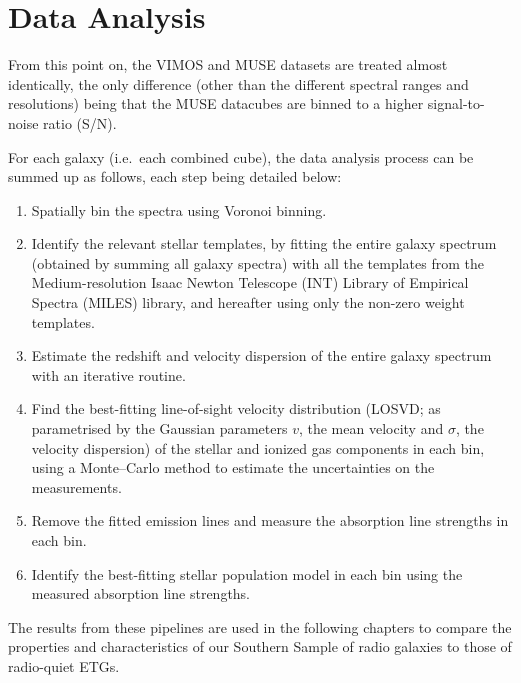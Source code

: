 \section{Data Analysis}
	\label{sec:analysis}
	From this point on, the VIMOS and MUSE datasets are treated almost identically, the only difference (other than the different spectral ranges and resolutions) being that the MUSE datacubes are binned to a higher signal-to-noise ratio (S/N).

	For each galaxy (i.e.\ each combined cube), the data analysis process can be summed up as follows, each step being detailed below:
	\begin{enumerate}
		\item Spatially bin the spectra using Voronoi binning.
		\item Identify the relevant stellar templates, by fitting the entire galaxy spectrum (obtained by summing all galaxy spectra) with all the templates from the Medium-resolution Isaac Newton Telescope (INT) Library of Empirical Spectra (MILES) library, and hereafter using only the non-zero weight templates.
		\item Estimate the redshift and velocity dispersion of the entire galaxy spectrum with an iterative routine. %
		\item Find the best-fitting line-of-sight velocity distribution (LOSVD; as parametrised by the Gaussian parameters $v$, the mean velocity and $\sigma$, the velocity dispersion) of the stellar and ionized gas components in each bin, using a Monte--Carlo method to estimate the uncertainties on the measurements. 
		\item Remove the fitted emission lines and measure the absorption line strengths in each bin. 
		\item Identify the best-fitting stellar population model in each bin using the measured absorption line strengths.
	\end{enumerate}

	The results from these pipelines are used in the following chapters to compare the properties and characteristics of our Southern Sample of radio galaxies to those of radio-quiet ETGs. 
	
